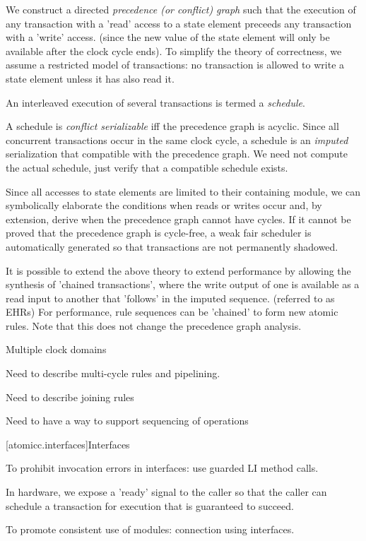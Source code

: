 We construct a directed \textit{precedence (or conflict) graph} such that the execution of
any transaction with a 'read' access to a state element preceeds
any transaction with a 'write' access. (since the new value of
the state element will only be available after the
clock cycle ends).
To simplify the theory of correctness, we assume a restricted model of transactions:
no transaction is allowed to write a state element
unless it has also read it.

An interleaved execution of several transactions is termed a \textit{schedule}.
\cite[p.~8]{Papa86}

A schedule is \textit{conflict serializable} iff the precedence graph is acyclic.
Since all concurrent transactions occur in the same clock
cycle, 
a schedule is an \textit{imputed} serialization that
compatible with the precedence graph.
We need not compute the actual schedule, just verify that
a compatible schedule exists.

Since all accesses to state elements are limited to their
containing module, we can symbolically elaborate the conditions
when reads or writes occur and, by extension, derive when the
precedence graph cannot have cycles.
If it cannot be proved that the precedence graph is cycle-free,
a weak fair scheduler is automatically generated so that
transactions are not permanently shadowed.

It is possible to extend the above theory to extend
performance by allowing the synthesis of
'chained transactions', where the write output of one is available
as a read input to another that 'follows' in the imputed sequence.
(referred to as EHRs)
For performance, rule sequences can be 'chained' to form new atomic rules.
Note that this does not change the precedence graph analysis.

Multiple clock domains

Need to describe multi-cycle rules and pipelining.

Need to describe joining rules

Need to have a way to support sequencing of operations

[atomicc.interfaces]{Interfaces}

To prohibit invocation errors in interfaces: use guarded LI method calls.

In hardware, we expose a 'ready'
signal to the caller so that the caller can schedule a transaction for execution
that is guaranteed to succeed. 

To promote consistent use of modules: connection using interfaces.

